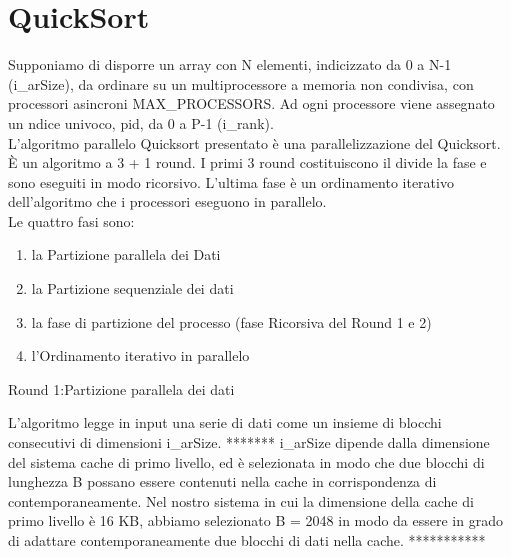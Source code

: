 \chapter{QuickSort}



Supponiamo di disporre un array con N elementi, indicizzato da 0 a N-1 (i_arSize), da ordinare su un multiprocessore a memoria non condivisa, con processori asincroni MAX_PROCESSORS. 
Ad ogni processore viene assegnato un ndice univoco, pid, da 0 a P-1 (i_rank).\\
L'algoritmo parallelo Quicksort presentato è una parallelizzazione del Quicksort. È un algoritmo a 3 + 1 round. I primi 3 round costituiscono il divide la fase e sono eseguiti in modo ricorsivo. L'ultima fase è un ordinamento iterativo dell'algoritmo che i processori eseguono in parallelo.\\
Le quattro fasi sono:
\begin{enumerate}
\item la Partizione parallela dei Dati 
\item la Partizione sequenziale dei dati
\item la fase di partizione del processo (fase Ricorsiva del Round 1 e 2)
\item l'Ordinamento iterativo in parallelo 
\end{enumerate}
 
\maketitle Round 1:Partizione parallela dei dati

L'algoritmo legge in input una serie di dati come un insieme di blocchi consecutivi di dimensioni i_arSize. 
******* 
i_arSize dipende dalla dimensione del sistema cache di primo livello, ed è selezionata in modo che due blocchi di lunghezza B possano essere contenuti nella cache in corrispondenza di contemporaneamente. Nel nostro sistema in cui la dimensione della cache di primo livello è 16 KB, abbiamo selezionato
B = 2048 in modo da essere in grado di adattare contemporaneamente due blocchi di dati nella cache. 
***********

